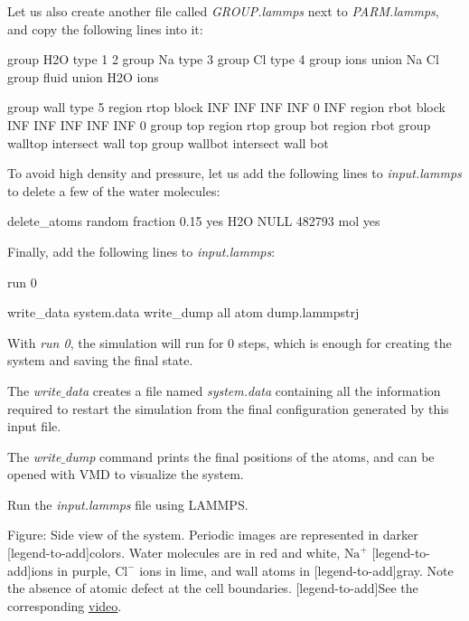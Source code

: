 \vspace{0.25cm} \noindent Let us also create another file called \textit{GROUP.lammps} next
to \textit{PARM.lammps}, and copy the following lines into it:

\begin{lcverbatim}
group H2O type 1 2
group Na type 3
group Cl type 4
group ions union Na Cl
group fluid union H2O ions

group wall type 5
region rtop block INF INF INF INF 0 INF
region rbot block INF INF INF INF INF 0
group top region rtop
group bot region rbot
group walltop intersect wall top
group wallbot intersect wall bot
\end{lcverbatim}

\noindent To avoid high density and pressure,
let us add the following lines to \textit{input.lammps}
to delete a few of the water molecules:

\begin{lcverbatim}
delete_atoms random fraction 0.15 yes H2O NULL 482793 mol yes
\end{lcverbatim}

\noindent Finally, add the following lines to \textit{input.lammps}:

\begin{lcverbatim}
run 0

write_data system.data
write_dump all atom dump.lammpstrj
\end{lcverbatim}

\noindent With \textit{run 0}, the simulation will run for 0 steps, which is
enough for creating the system and saving the final state.

\vspace{0.25cm} \noindent The \textit{write$\_$data} creates a file named \textit{system.data}
containing all the information required to restart the
simulation from the final configuration generated by this
input file.

\vspace{0.25cm} \noindent The \textit{write$\_$dump} command prints the final
positions of the atoms, and can be opened with VMD
to visualize the system.

\vspace{0.25cm} \noindent Run the \textit{input.lammps} file using LAMMPS. 

\vspace{0.25cm} Figure: Side view of the system. Periodic images are represented in darker
[legend-to-add]colors. Water molecules are in red and white, $\text{Na}^+$
[legend-to-add]ions in purple, $\text{Cl}^-$ ions in lime, and wall atoms in
[legend-to-add]gray. Note the absence of atomic defect at the cell boundaries.
[legend-to-add]See the corresponding \href{https://youtu.be/SK3FkJt0TmM}{video}.

